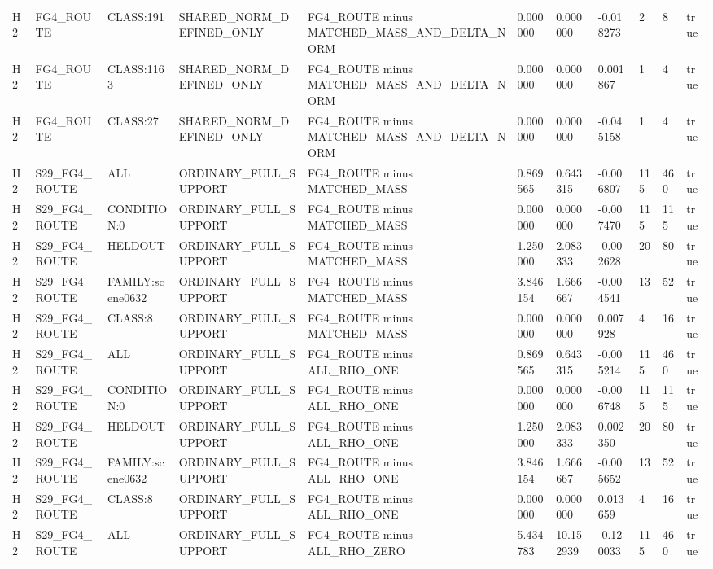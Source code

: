 \begin{tabular}{lllllllllll}
H2 & FG4\_ROUTE & CLASS:191 & SHARED\_NORM\_DEFINED\_ONLY & FG4\_ROUTE minus MATCHED\_MASS\_AND\_DELTA\_NORM & 0.000000 & 0.000000 & -0.018273 & 2 & 8 & true \\
H2 & FG4\_ROUTE & CLASS:1163 & SHARED\_NORM\_DEFINED\_ONLY & FG4\_ROUTE minus MATCHED\_MASS\_AND\_DELTA\_NORM & 0.000000 & 0.000000 & 0.001867 & 1 & 4 & true \\
H2 & FG4\_ROUTE & CLASS:27 & SHARED\_NORM\_DEFINED\_ONLY & FG4\_ROUTE minus MATCHED\_MASS\_AND\_DELTA\_NORM & 0.000000 & 0.000000 & -0.045158 & 1 & 4 & true \\
H2 & S29\_FG4\_ROUTE & ALL & ORDINARY\_FULL\_SUPPORT & FG4\_ROUTE minus MATCHED\_MASS & 0.869565 & 0.643315 & -0.006807 & 115 & 460 & true \\
H2 & S29\_FG4\_ROUTE & CONDITION:0 & ORDINARY\_FULL\_SUPPORT & FG4\_ROUTE minus MATCHED\_MASS & 0.000000 & 0.000000 & -0.007470 & 115 & 115 & true \\
H2 & S29\_FG4\_ROUTE & HELDOUT & ORDINARY\_FULL\_SUPPORT & FG4\_ROUTE minus MATCHED\_MASS & 1.250000 & 2.083333 & -0.002628 & 20 & 80 & true \\
H2 & S29\_FG4\_ROUTE & FAMILY:scene0632 & ORDINARY\_FULL\_SUPPORT & FG4\_ROUTE minus MATCHED\_MASS & 3.846154 & 1.666667 & -0.004541 & 13 & 52 & true \\
H2 & S29\_FG4\_ROUTE & CLASS:8 & ORDINARY\_FULL\_SUPPORT & FG4\_ROUTE minus MATCHED\_MASS & 0.000000 & 0.000000 & 0.007928 & 4 & 16 & true \\
H2 & S29\_FG4\_ROUTE & ALL & ORDINARY\_FULL\_SUPPORT & FG4\_ROUTE minus ALL\_RHO\_ONE & 0.869565 & 0.643315 & -0.005214 & 115 & 460 & true \\
H2 & S29\_FG4\_ROUTE & CONDITION:0 & ORDINARY\_FULL\_SUPPORT & FG4\_ROUTE minus ALL\_RHO\_ONE & 0.000000 & 0.000000 & -0.006748 & 115 & 115 & true \\
H2 & S29\_FG4\_ROUTE & HELDOUT & ORDINARY\_FULL\_SUPPORT & FG4\_ROUTE minus ALL\_RHO\_ONE & 1.250000 & 2.083333 & 0.002350 & 20 & 80 & true \\
H2 & S29\_FG4\_ROUTE & FAMILY:scene0632 & ORDINARY\_FULL\_SUPPORT & FG4\_ROUTE minus ALL\_RHO\_ONE & 3.846154 & 1.666667 & -0.005652 & 13 & 52 & true \\
H2 & S29\_FG4\_ROUTE & CLASS:8 & ORDINARY\_FULL\_SUPPORT & FG4\_ROUTE minus ALL\_RHO\_ONE & 0.000000 & 0.000000 & 0.013659 & 4 & 16 & true \\
H2 & S29\_FG4\_ROUTE & ALL & ORDINARY\_FULL\_SUPPORT & FG4\_ROUTE minus ALL\_RHO\_ZERO & 5.434783 & 10.152939 & -0.120033 & 115 & 460 & true \\

\end{tabular}
